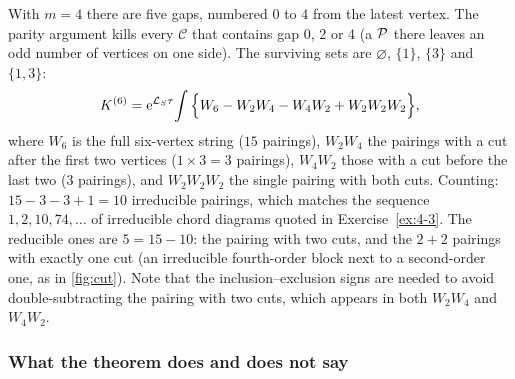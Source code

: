 \begin{exbox}
With $m=4$ there are five gaps, numbered $0$ to $4$ from the latest vertex.
The parity argument kills every $\mathcal C$ that contains gap $0$, $2$ or $4$ (a $\mathcal{P}$ there leaves an odd number of vertices on one side).
The surviving sets are $\varnothing$, $\{1\}$, $\{3\}$ and $\{1,3\}$:
\begin{equation}
  K^{(6)}=\mathrm{e}^{\mathcal{L}_S\tau}\!\int\Big\{W_6-W_2W_4-W_4W_2+W_2W_2W_2\Big\},
\end{equation}
where $W_6$ is the full six-vertex string ($15$ pairings), $W_2W_4$ the pairings with a cut after the first two vertices ($1\times3=3$ pairings), $W_4W_2$ those with a cut before the last two ($3$ pairings), and $W_2W_2W_2$ the single pairing with both cuts.
Counting: $15-3-3+1=10$ irreducible pairings, which matches the sequence $1,2,10,74,\dots$ of irreducible chord diagrams quoted in Exercise~\ref{ex:4-3}.
The reducible ones are $5=15-10$: the pairing with two cuts, and the $2+2$ pairings with exactly one cut (an irreducible fourth-order block next to a second-order one, as in \cref{fig:cut}).
Note that the inclusion--exclusion signs are needed to avoid double-subtracting the pairing with two cuts, which appears in both $W_2W_4$ and $W_4W_2$.
\end{exbox}

\subsubsection{What the theorem does and does not say}

